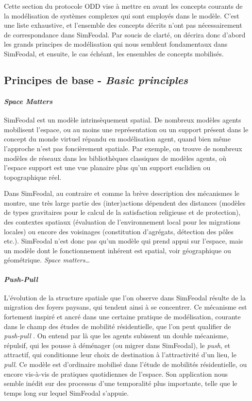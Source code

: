 Cette section du protocole ODD vise à mettre en avant les concepts courants de la modélisation de systèmes complexes qui sont employés dans le modèle.
C'est une liste exhaustive, et l'ensemble des concepts décrits n'ont pas nécessairement de correspondance dans SimFeodal.
Par soucis de clarté, on décrira donc d'abord les grands principes de modélisation qui nous semblent fondamentaux dans SimFeodal, et ensuite, le cas échéant, les ensembles de concepts mobilisés.

\subsection{Principes de base - \textit{Basic principles}}

\paragraph{\textit{Space Matters}}

SimFeodal est un modèle intrinsèquement spatial.
De nombreux modèles agents mobilisent l'espace, ou au moins une représentation ou un support présent dans le concept du \og monde\fg{} virtuel répandu en modélisation agent, quand bien même l'approche n'est pas foncièrement spatiale.
Par exemple, on trouve de nombreux modèles de réseaux dans les bibliothèques classiques de modèles agents, où l'espace support est une vue planaire plus qu'un support euclidien ou topographique réel.

Dans SimFeodal, au contraire et comme la brève description des mécanismes le montre, une très large partie des (inter)actions dépendent des distances (modèles de types gravitaires pour le calcul de la satisfaction religieuse et de protection), des contextes spatiaux (évaluation de l'environnement local pour les migrations locales) ou encore des voisinages (constitution d'agrégats, détection des pôles etc.).
SimFeodal n'est donc pas qu'un modèle qui prend appui sur l'espace, mais un modèle dont le fonctionnement inhérent est spatial, voir géographique ou géométrique.
\textit{Space matters}\ldots

\paragraph{\textit{Push-Pull}}

L'évolution de la structure spatiale que l'on observe dans SimFeodal résulte de la migration des foyers paysans, qui tendent ainsi à se concentrer.
Ce mécanisme est fortement inspiré et ancré dans une certaine pratique de modélisation, courante dans le champ des études de mobilité résidentielle, que l'on peut qualifier de \og \textit{push-pull}\fg{} \autocite{tannier_analyse_2017}.
On entend par là que les agents subissent un double mécanisme, répulsif, qui les pousse à déménager (ou migrer dans SimFeodal), le \textit{push}, et attractif, qui conditionne leur choix de destination à l'attractivité d'un lieu, le \textit{pull}.
Ce modèle est d'ordinaire mobilisé dans l'étude de mobilités résidentielle, ou encore vis-à-vis de pratiques quotidiennes de l'espace.
Son application nous semble inédit sur des processus d'une temporalité plus importante, telle que le temps long sur lequel SimFeodal s'appuie.


